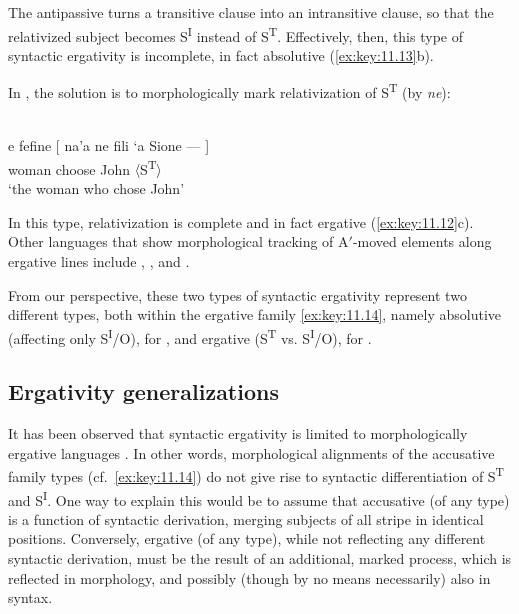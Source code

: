 \documentclass[output=paper]{langsci/langscibook}
\begin{document}
The antipassive turns a transitive clause into an intransitive clause, so that
the relativized subject becomes S\textsuperscript{I} instead of
S\textsuperscript{T}. Effectively, then, this type of syntactic ergativity is
incomplete, in fact absolutive (\ref{ex:key:11.13}b).

In , the solution is to morphologically mark relativization of
S\textsuperscript{T} (by \emph{ne}):\newpage

\ea%
    \label{ex:key:11.22} {\parencite[81]{Otsuka2006}}\\
    \gll e    fefine  [  na'a  ne  fili      ‘a    Sione  —    ]\\
        \Def{}  woman {}   \Pst{}  \Tsg{}  choose    \Abs{}  John  〈S\textsuperscript{T}〉\\
    \glt ‘the woman who chose John’
    \z

In this type, relativization is complete and in fact ergative
(\ref{ex:key:11.12}c). Other languages that show morphological tracking of
A$'$-moved elements along ergative lines include , ,
and  \citep[180--181]{Deal2016}.

From our perspective, these two types of syntactic ergativity represent two
different  types, both within the ergative family \eqref{ex:key:11.14}, namely
absolutive (affecting only S\textsuperscript{I}/O), for , and
ergative (S\textsuperscript{T} vs. S\textsuperscript{I}/O), for .

\subsection{Ergativity generalizations}\label{sec:key:11.5.6}

It has been observed that syntactic ergativity is limited to
morphologically ergative languages
\citep[172]{Dixon1994}. In other words, morphological alignments of the
accusative family types (cf.\ \eqref{ex:key:11.14}) do not give rise to
syntactic differentiation of S\textsuperscript{T} and S\textsuperscript{I}. One
way to explain this would be to assume that accusative  (of any
type) is a function of syntactic derivation, merging subjects of all stripe in
identical positions. Conversely, ergative  (of any type), while
not reflecting any different syntactic derivation, must be the result of an
additional, marked process, which is reflected in morphology, and possibly
(though by no means necessarily) also in syntax.
\end{document}
